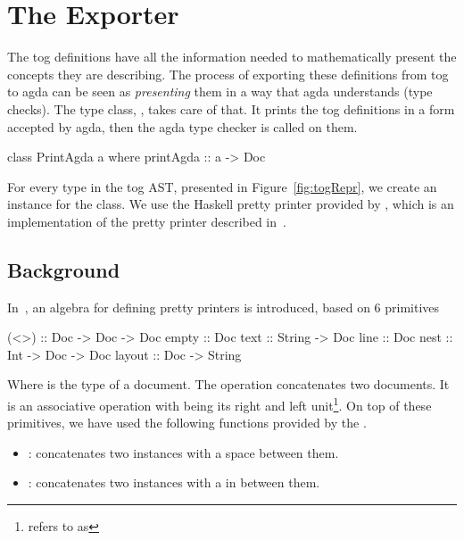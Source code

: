 \section{The Exporter}
\label{sec:exporting_agda}
The tog definitions have all the information needed to mathematically present the concepts they are describing. The process of exporting these definitions from tog to agda can be seen as \emph{presenting} them in a way that agda understands (type checks). The type class, , takes care of that. It prints the tog definitions in a form accepted by agda, then the agda type checker is called on them. 
\begin{hscode}
class PrintAgda a where
  printAgda ::  a -> Doc   
\end{hscode}
For every type in the tog AST, presented in Figure~\ref{fig:togRepr}, we create an instance for the  class. 
We use the Haskell pretty printer provided by , which is an implementation of the pretty printer described in~\cite{wadler2003prettier}. 

\subsection{Background}
In~\cite{wadler2003prettier}, an algebra for defining pretty printers is introduced, based on $6$ primitives 
\begin{hscode}
(<>) :: Doc -> Doc -> Doc 
empty  :: Doc 
text :: String -> Doc 
line :: Doc 
nest :: Int -> Doc -> Doc 
layout :: Doc -> String 
\end{hscode}
Where  is the type of a document. The \lstmath{(<>)} operation concatenates two documents. It is an associative operation with  being its right and left unit\footnote{\cite{wadler2003prettier} refers to  as }. 
On top of these primitives, we have used the following functions provided by the 
. 
\begin{itemize}
\item \lstmath{(<+>)} : concatenates two  instances with a space between them. 
\item \lstmath{(<$\$$>)} : concatenates two  instances with a  in between them. 
\end{itemize}

